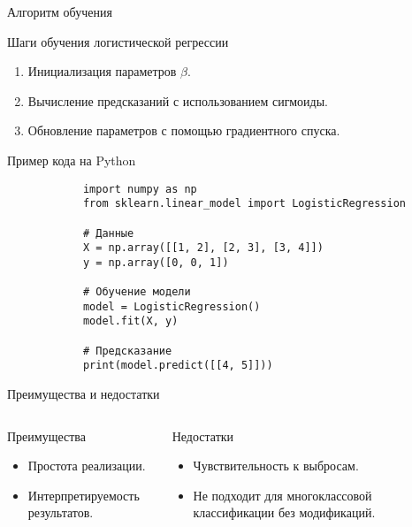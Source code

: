 \documentclass[aspectratio=169, handout]{beamer}
\begin{document}
	\begin{frame}[fragile]{Алгоритм обучения}
		\begin{block}{Шаги обучения логистической регрессии}
			\begin{enumerate}
				\item<1-> Инициализация параметров $ \beta $.
				\item<2-> Вычисление предсказаний с использованием сигмоиды.
				\item<3-> Обновление параметров с помощью градиентного спуска.
			\end{enumerate}
		\end{block}
	\end{frame}
	
	\begin{frame}[fragile]{Пример кода на Python}
		\begin{verbatim}
			import numpy as np
			from sklearn.linear_model import LogisticRegression
			
			# Данные
			X = np.array([[1, 2], [2, 3], [3, 4]])
			y = np.array([0, 0, 1])
			
			# Обучение модели
			model = LogisticRegression()
			model.fit(X, y)
			
			# Предсказание
			print(model.predict([[4, 5]]))
		\end{verbatim}
	\end{frame}
	
	\begin{frame}{Преимущества и недостатки}
		\begin{columns}
			\begin{column}{0.5\textwidth}
				\begin{block}{Преимущества}
					\begin{itemize}
						\item Простота реализации.
						\item Интерпретируемость результатов.
					\end{itemize}
				\end{block}
			\end{column}
			\begin{column}{0.5\textwidth}
				\begin{block}{Недостатки}
					\begin{itemize}
						\item Чувствительность к выбросам.
						\item Не подходит для многоклассовой классификации без модификаций.
					\end{itemize}
				\end{block}
			\end{column}
		\end{columns}
	\end{frame}
	
\end{document}
